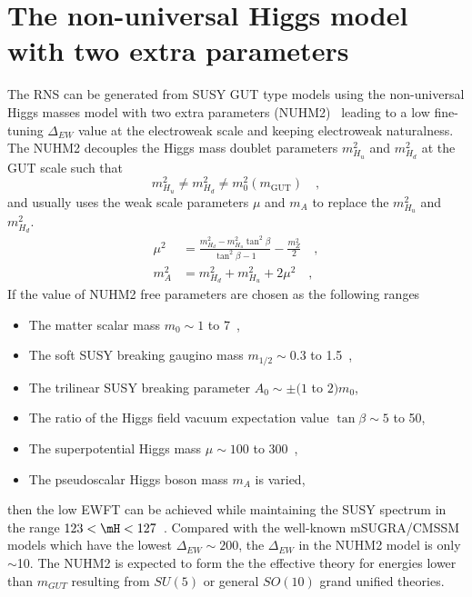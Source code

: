 \section{The non-universal Higgs model with two extra parameters}
\label{sec:susy_nuhm2}
The RNS can be generated from SUSY GUT type models using the non-universal Higgs masses model with two extra parameters (NUHM2)~\cite{Ellis:2002wv, Ellis:2002iu, Baer:2004fu, Baer:2005bu} leading to a low fine-tuning $\Delta_{EW}$ value at the electroweak scale and keeping electroweak naturalness.
The NUHM2 decouples the Higgs mass doublet parameters $m^{2}_{H_{u}}$ and $m^{2}_{H_{d}}$ at the GUT scale such that
%
\begin{equation}
    m^{2}_{H_{u}} \neq m^{2}_{H_{d}} \neq m^{2}_{0}(m_{\text{GUT}}) \quad ,
    \label{eq:susy_nuhm2_decouple}
\end{equation}
%
and usually uses the weak scale parameters $\mu$ and $m_{A}$ to replace the $m^{2}_{H_{u}}$ and $m^{2}_{H_{d}}$.
%
\begin{align}
    \mu^{2} &= \frac{m^{2}_{H_{d}} - m^{2}_{H_{u}}\tan^{2}\beta}{\tan^{2}\beta - 1} - \frac{m^{2}_{Z}}{2} \quad ,\\
    m^{2}_{A} &= m^{2}_{H_{d}} + m^{2}_{H_{u}} + 2\mu^{2} \quad ,
    \label{eq:susy_weak_scale_parameters}
\end{align}
%
If the value of NUHM2 free parameters are chosen as the following ranges
%
\begin{itemize}
    \item The matter scalar mass $m_{0} \sim 1$ to 7~{\TeV},
    \item The soft SUSY breaking gaugino mass $m_{1/2} \sim 0.3$ to 1.5~{\TeV},
    \item The trilinear SUSY breaking parameter $A_{0} \sim \pm(1$ to $2) m_{0}$,
    \item The  ratio of the Higgs field vacuum expectation value $\tan\beta \sim 5$ to 50,
    \item The superpotential Higgs mass $\mu \sim 100$ to 300~{\GeV},
    \item The pseudoscalar Higgs boson mass $m_{A}$ is varied,
\end{itemize}
%
then the low EWFT can be achieved while maintaining the SUSY spectrum in the range $123 < \mH < 127$~{\GeV}.
Compared with the well-known mSUGRA/CMSSM models which have the lowest $\Delta_{EW} \sim 200$, the $\Delta_{EW}$ in the NUHM2 model is only $\sim$10.
The NUHM2 is expected to form the the effective theory for energies lower than $m_{GUT}$ resulting from $SU(5)$ or general $SO(10)$ grand unified theories.
